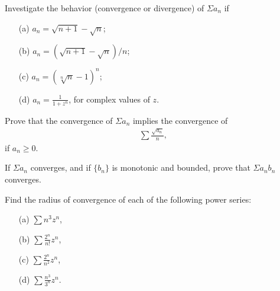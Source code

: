   \begin{exercise}[Rudin 3.6]
    Investigate the behavior (convergence or divergence) of $\Sigma a_n$ if
    \begin{enumerate} 
      \item[(a)] $a_n = \sqrt{n+1} - \sqrt{n}$;
      \item[(b)] $a_n = (\sqrt{n+1} - \sqrt{n})/n$;
      \item[(c)] $a_n = (\sqrt[n]{n} - 1)^n$;
      \item[(d)] $a_n = \frac{1}{1+z^n}$, for complex values of $z$.
    \end{enumerate}
  \end{exercise}
  \begin{solution}
    
  \end{solution}

  \begin{exercise}[Rudin 3.7]
    Prove that the convergence of $\Sigma a_n$ implies the convergence of
    \begin{align*}
      \sum \frac{\sqrt{a_n}}{n},
    \end{align*}
    if $a_n \geq 0$.
  \end{exercise}
  \begin{solution}
    
  \end{solution}

  \begin{exercise}[Rudin 3.8]
    If $\Sigma a_n$ converges, and if $\{b_n\}$ is monotonic and bounded, prove that $\Sigma a_n b_n$ converges.
  \end{exercise}
  \begin{solution}
    
  \end{solution}

  \begin{exercise}[Rudin 3.9]
    Find the radius of convergence of each of the following power series:
    \begin{enumerate} 
      \item[(a)] $\sum n^3 z^n$,
      \item[(b)] $\sum \frac{2^n}{n!} z^n$,
      \item[(c)] $\sum \frac{2^n}{n^2} z^n$,
      \item[(d)] $\sum \frac{n^3}{3^n} z^n$.
    \end{enumerate}
  \end{exercise}
  \begin{solution}
    
  \end{solution}

